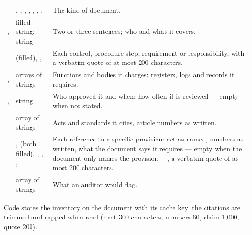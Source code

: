 \par\nopagebreak
\begin{xltabular}{\textwidth}{@{}L{34mm}L{40mm}Y@{}}
\toprule
{} &  &  \\
\midrule
\endhead
\bottomrule
\endlastfoot
{} & , , , , , , ,  & The kind of document. \\
,  & filled string; string & Two or three sentences; who and what it covers. \\
 &  (filled), ,  & Each control, procedure step, requirement or responsibility, with a verbatim quote of at most 200 characters. \\
,  & arrays of strings & Functions and bodies it charges; registers, logs and records it requires. \\
,  & string & Who approved it and when; how often it is reviewed --- empty when not stated. \\
 & array of strings & Acts and standards it cites, article numbers as written. \\
 & ,  (both filled), , , ,  & Each reference to a specific provision: act as named, numbers as written, what the document says it requires --- empty when the document only names the provision ---, a verbatim quote of at most 200 characters. \\
 & array of strings & What an auditor would flag. \\
\end{xltabular}

Code stores the inventory on the document with its cache key; the citations are trimmed and
capped when read (: act 300 characters, numbers 60, claim 1{,}000, quote
200).

